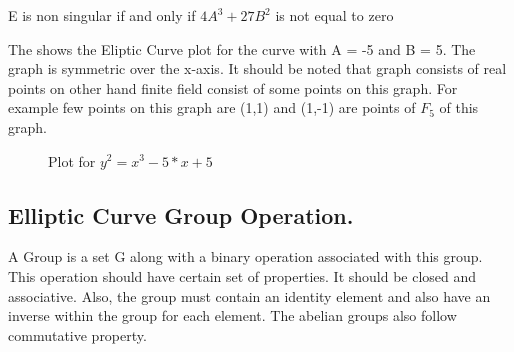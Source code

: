 \begin{lemma}
 E is non singular if and only if $4A^{3} + 27B^{2}$ is not equal to zero
\end{lemma}

The  shows the Eliptic Curve plot for the curve with A = -5 and B = 5. The graph is symmetric over the x-axis. It should be noted that graph consists of real points on other hand finite field consist of some points on this graph. For example few points on this graph are (1,1) and (1,-1) are points of $F_5$ of this graph.


\begin{figure}[!h]
\begin{adjustbox}
{center}
    \end{adjustbox}
      \caption{Plot for $y^2=x^3-5*x+5$}
        \label{fig:plot}

\end{figure}

\subsection{Elliptic Curve Group Operation.} A Group is a set G along with a binary operation associated with this group. This operation should have certain set of properties. It should be closed and associative. Also, the group must contain an identity element and also have an inverse within the group for each element. The abelian groups also follow commutative property. 

